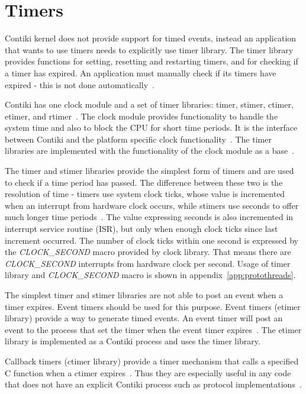 
\section{Timers}\label{sec:contiki-timers}
Contiki kernel does not provide support for timed events,
instead an application that wants to use timers needs to explicitly use timer library.
The timer library provides functions for setting, resetting and restarting timers,
and for checking if a timer has expired.
An application must manually check if its timers have expired - this is not done automatically~\cite{contiki-docs}.

Contiki has one clock module and a set of timer libraries: timer, stimer, ctimer, etimer, and rtimer~\cite{contiki-wiki-timers}.
The clock module provides functionality to handle the system time and also to block the CPU for short time periods.
It is the interface between Contiki and the platform specific clock functionality~\cite{contiki-docs}.
The timer libraries are implemented with the functionality of the clock module as a base~\cite{contiki-wiki-timers}.

The timer and stimer libraries provide the simplest form of timers and are used to check if a time period has passed.
The difference between these two is the resolution of time -
timers use system clock ticks, whose value is incremented when an interrupt from hardware clock occurs,
while stimers use seconds to offer much longer time periods~\cite{contiki-wiki-timers}.
The value expressing seconds is also incremented in interrupt service routine (ISR),
but only when enough clock ticks since last increment occurred.
The number of clock ticks within one second is expressed by the
{\it{CLOCK\_SECOND}} macro provided by clock library.
That means there are {\it{CLOCK\_SECOND}} interrupts from hardware clock per second.
Usage of timer library and {\it{CLOCK\_SECOND}} macro is shown in appendix~\ref{app:protothreads}.

The simplest timer and stimer libraries are not able to post an event when a timer expires.
Event timers should be used for this purpose.
Event timers (etimer library) provide a way to generate timed events.
An event timer will post an event to the process that set the timer when the
event timer expires~\cite{contiki-docs}.
The etimer library is implemented as a Contiki process and uses the timer library.

Callback timers (ctimer library) provide a timer mechanism that calls a specified
C function when a ctimer expires~\cite{contiki-docs}.
Thus they are especially useful in any code that does not have an
explicit Contiki process such as protocol implementations~\cite{contiki-wiki-timers}.

